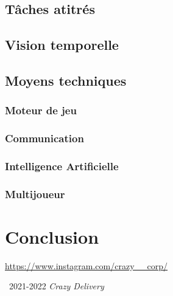 \documentclass[11pt,a4paper]{article}
\newcommand{\cd}{\textit{Crazy Delivery}}
\newcommand{\AI}{Intelligence Artificielle}
\begin{document}
  \subsection{Tâches atitrés} 
    
  \clearpage

  \subsection{Vision temporelle}
    
  \clearpage

  \subsection{Moyens techniques}
    \subsubsection{Moteur de jeu}
      
    \subsubsection{Communication}
      
    \subsubsection{\AI}
      
    \subsubsection{Multijoueur}
      
\clearpage

\section{Conclusion}

\begin{bibliography}{9}
    \url{https://www.instagram.com/crazy__corp/}

\end{bibliography}

\textcopyright\, 2021-2022 \cd
\end{document}

